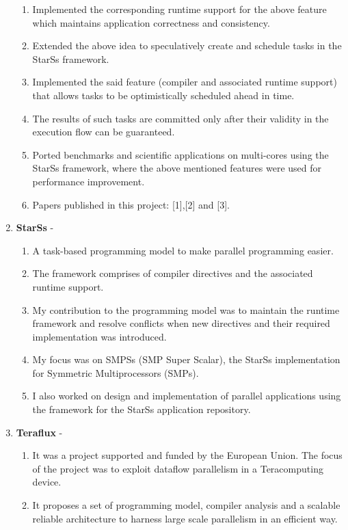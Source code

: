 \documentclass[margin]{res}
\begin{document}
\begin{resume}
\begin{enumerate}
\begin{enumerate}
				    \item Implemented the corresponding runtime support for the above feature which maintains application correctness and consistency. 
				    \item Extended the above idea to speculatively create and schedule tasks in the StarSs framework.
				    \item Implemented the said feature (compiler and associated runtime support) that allows tasks to be optimistically scheduled ahead in time.
				    \item The results of such tasks are committed only after their validity in the execution flow can be guaranteed.
				    \item Ported benchmarks and scientific applications on multi-cores using the StarSs framework, where the above mentioned features were used for performance improvement.
				    \item Papers published in this project: [1],[2] and [3].
	  		\end{enumerate}
%
	   \item {\bf StarSs} - 
			 \begin{enumerate}
				    \item A task-based programming model to make parallel programming easier.
				    \item The framework comprises of compiler directives and the associated runtime support.
				    \item My contribution to the programming model was to maintain the runtime framework and resolve conflicts when new directives and their required implementation was introduced. 
				    \item My focus was on SMPSs (SMP Super Scalar), the StarSs implementation for Symmetric Multiprocessors (SMPs).
				    \item I also worked on design and implementation of parallel applications using the framework for the StarSs application repository.
			 \end{enumerate}
%
	   \item {\bf Teraflux} - 
			 \begin{enumerate}
				    \item It was a project supported and funded by the European Union.
				    The focus of the project was to exploit dataflow parallelism in a Teracomputing device. 
				    \item It proposes a set of programming model, compiler analysis and a scalable reliable architecture to harness large scale parallelism in an efficient way.

\end{enumerate}
\end{enumerate}
\end{resume}
\end{document}
